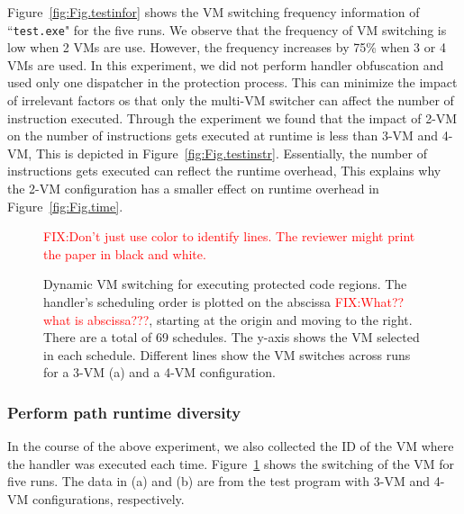 \documentclass[preprint,12pt,3p]{elsarticle}
\newcommand\FIXME[1]{\textcolor{red}{FIX:}\textcolor{red}{#1}}
\begin{document}
Figure~\ref{fig:Fig.testinfor} shows the VM switching frequency information of ``\texttt{test.exe}" for the five runs. 
We observe that the frequency of VM switching is low when 2 VMs are use.
However, the frequency increases by 75\% when 3 or 4 VMs are used. 
In this experiment, we did not perform handler obfuscation and used only one dispatcher in the protection process.
This can minimize the impact of irrelevant factors os that only the multi-VM switcher can affect the number of instruction executed.
Through the experiment we found that the impact of 2-VM on the number of instructions gets executed at runtime is less than 3-VM and 4-VM,
This is depicted in Figure~\ref{fig:Fig.testinstr}.
Essentially, the number of instructions gets executed can reflect the runtime overhead, 
This explains why the 2-VM configuration has a smaller effect on runtime overhead in Figure~\ref{fig:Fig.time}.

\begin{figure}[t]
\centering
{}
\caption{Dynamic VM switching for executing protected code regions. 
The handler's scheduling order is plotted on the abscissa \FIXME{What?? what is abscissa???}, starting at the origin and moving to the right. There are a total of 69 schedules. 
The y-axis shows the VM selected in each schedule. Different lines show the VM switches across runs for a 3-VM (a) and a 4-VM configuration. }
\FIXME{Don't just use color to identify lines. The reviewer might print the paper in black and white.}
\label{fig:Fig.execvm}
\end{figure}

\subsubsection{Perform path runtime diversity}
In the course of the above experiment, we also collected the ID of the VM where the handler was executed each time.
Figure~\ref{fig:Fig.execvm} shows the switching of the VM for five runs.
The data in (a) and (b) are from the test program with 3-VM and 4-VM configurations, respectively.
\end{document}
